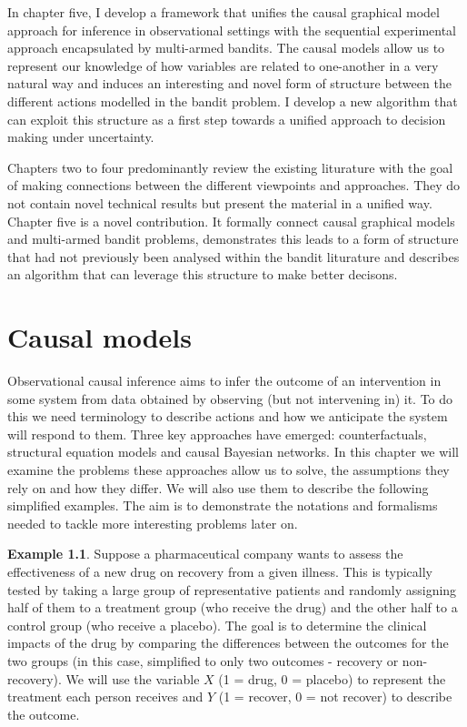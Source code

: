 \documentclass[11pt,a4paper,oneside]{book}
\theoremstyle{plain}
\theoremstyle{definition}
\newtheorem{example}[theorem]{Example}
\begin{document}
In chapter five, I develop a framework that unifies the causal graphical model approach for inference in observational settings with the sequential experimental approach encapsulated by multi-armed bandits. The causal models allow us to represent our knowledge of how variables are related to one-another in a very natural way and induces an interesting and novel form of structure between the different actions modelled in the bandit problem. I develop a new algorithm that can exploit this structure as a first step towards a unified approach to decision making under uncertainty. 

Chapters two to four predominantly review the existing liturature with the goal of making connections between the different viewpoints and approaches. They do not contain novel technical results but present the material in a unified way. Chapter five is a novel contribution. It formally connect causal graphical models and multi-armed bandit problems, demonstrates this leads to a form of structure that had not previously been analysed within the bandit liturature and describes an algorithm that can leverage this structure to make better decisons. 

\chapter{Causal models}
\label{chap:causal_models}

Observational causal inference aims to infer the outcome of an intervention in some system from data obtained by observing (but not intervening in) it. To do this we need terminology to describe actions and how we anticipate the system will respond to them. Three key approaches have emerged: counterfactuals, structural equation models and causal Bayesian networks. In this chapter we will examine the problems these approaches allow us to solve, the assumptions they rely on and how they differ. We will also use them to describe the following simplified examples. The aim is to demonstrate the notations and formalisms needed to tackle more interesting problems later on.

\vspace*{.3cm}
\begin{example}
\label{exm:ranomized_experiment}
Suppose a pharmaceutical company wants to assess the effectiveness of a new drug on recovery from a given illness. This is typically tested by taking a large group of representative patients and randomly assigning half of them to a treatment group (who receive the drug) and the other half to a control group (who receive a placebo). The goal is to determine the clinical impacts of the drug by comparing the differences between the outcomes for the two groups (in this case, simplified to only two outcomes - recovery or non-recovery). We will use the variable $X$ (1 = drug, 0 = placebo) to represent the treatment each person receives and $Y$ (1 = recover, 0 = not recover) to describe the outcome. 
\end{example}
\end{document}
